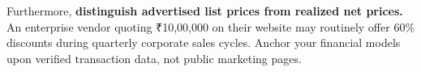 Furthermore, \textbf{distinguish advertised list prices from realized net prices.} An enterprise vendor quoting ₹10,00,000 on their website may routinely offer 60\% discounts during quarterly corporate sales cycles. Anchor your financial models upon verified transaction data, not public marketing pages.
